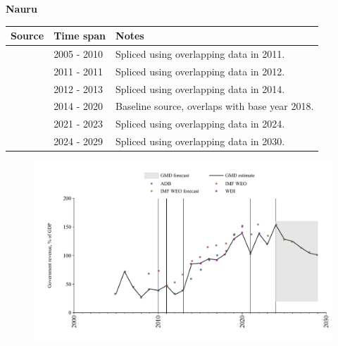 \documentclass[12pt,a4paper,landscape]{article}
\begin{document}
\begin{adjustbox}{max totalsize={\paperwidth}{\paperheight},center}
\begin{minipage}[t][\textheight][t]{\textwidth}
\vspace*{0.5cm}
{}
\begin{center}
{\Large\bfseries Nauru}
\end{center}
\vspace{0.5cm}
\begin{table}[H]
\centering
\small
\begin{tabular}{|l|l|l|}
\hline
\textbf{Source} & \textbf{Time span} & \textbf{Notes} \\
\hline
\rowcolor{white}\cite{ADB}& 2005 - 2010 &Spliced using overlapping data in 2011.\\
\rowcolor{lightgray}\cite{IMF_WEO}& 2011 - 2011 &Spliced using overlapping data in 2012.\\
\rowcolor{white}\cite{ADB}& 2012 - 2013 &Spliced using overlapping data in 2014.\\
\rowcolor{lightgray}\cite{WDI}& 2014 - 2020 &Baseline source, overlaps with base year 2018.\\
\rowcolor{white}\cite{ADB}& 2021 - 2023 &Spliced using overlapping data in 2024.\\
\rowcolor{lightgray}\cite{IMF_WEO_forecast}& 2024 - 2029 &Spliced using overlapping data in 2030.\\
\hline
\end{tabular}
\end{table}
\begin{figure}[H]
\centering
\includegraphics[width=\textwidth,height=0.6\textheight,keepaspectratio]{graphs/NRU_govrev_GDP.pdf}
\end{figure}
\end{minipage}
\end{adjustbox}
\end{document}
